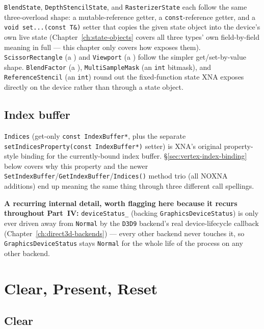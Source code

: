 \texttt{BlendState}, \texttt{DepthStencilState}, and \texttt{RasterizerState} each follow the
same three-overload shape: a mutable-reference getter, a \texttt{const}-reference getter, and a
\texttt{void set...(const T\&)} setter that copies the given state object into the device's own
live state (Chapter~\ref{ch:state-objects} covers all three types' own field-by-field meaning
in full --- this chapter only covers how  exposes them).
\texttt{ScissorRectangle} (a ) and \texttt{Viewport} (a )
follow the simpler get/set-by-value shape. \texttt{BlendFactor} (a ),
\texttt{MultiSampleMask} (an \texttt{int} bitmask), and \texttt{ReferenceStencil} (an
\texttt{int}) round out the fixed-function state XNA exposes directly on the device rather than
through a state object.

\subsection{Index buffer}

\texttt{Indices} (get-only \texttt{const IndexBuffer*}, plus the separate
\texttt{setIndicesProperty(const IndexBuffer*)} setter) is XNA's original property-style
binding for the currently-bound index buffer. \S\ref{sec:vertex-index-binding} below covers why
this property and the newer \texttt{SetIndexBuffer}/\texttt{GetIndexBuffer}/\texttt{Indices()}
method trio (all NOXNA additions) end up meaning the same thing through three different
call spellings.

\begin{sourcenote}
\textbf{A recurring internal detail, worth flagging here because it recurs throughout
Part~IV:} \texttt{deviceStatus\_} (backing \texttt{GraphicsDeviceStatus}) is only ever driven
away from \texttt{Normal} by the \texttt{D3D9} backend's real device-lifecycle callback
(Chapter~\ref{ch:direct3d-backends}) --- every other backend never touches it, so
\texttt{GraphicsDeviceStatus} stays \texttt{Normal} for the whole life of the process on any
other backend.
\end{sourcenote}

\section{Clear, Present, Reset}
\label{sec:clear-present-reset}

\subsection{Clear}

